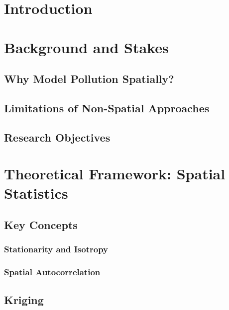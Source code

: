 \documentclass[12pt, a4paper]{report}
\begin{document}
\tableofcontents
\newpage

\begin{abstract}
\end{abstract}

\chapter*{Introduction}

\chapter{Background and Stakes}

\section{Why Model Pollution Spatially?}

\section{Limitations of Non-Spatial Approaches}

\section{Research Objectives}

\chapter{Theoretical Framework: Spatial Statistics}

\section{Key Concepts}
\subsection{Stationarity and Isotropy}
\subsection{Spatial Autocorrelation}

\section{Kriging}
\end{document}
